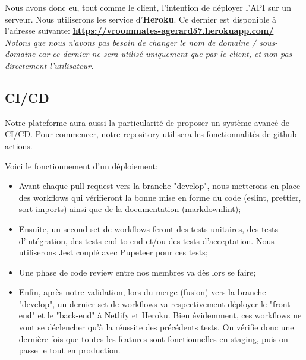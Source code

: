 Nous avons donc eu, tout comme le client, l'intention de déployer l'API sur un serveur. Nous utiliserons les service d'\textbf{Heroku}. Ce dernier est disponible à l'adresse suivante: \textbf{\href{https://vroommates-agerard57.herokuapp.com/}{https://vroommates-agerard57.herokuapp.com/}}\\

\textit{Notons que nous n'avons pas besoin de changer le nom de domaine / sous-domaine car ce dernier ne sera utilisé uniquement que par le client, et non pas directement l'utilisateur.}

\subsection{CI/CD}

Notre plateforme aura aussi la particularité de proposer un système avancé de CI/CD.
Pour commencer, notre repository utilisera les fonctionnalités de github actions. 

Voici le fonctionnement d'un déploiement:

\begin{itemize}
\item Avant chaque pull request vers la branche "develop", nous metterons en place des workflows qui vérifieront la bonne mise en forme du code (eslint, prettier, sort imports) ainsi que de la documentation (markdownlint);
\item Ensuite, un second set de workflows feront des tests unitaires, des tests d'intégration, des tests end-to-end et/ou des tests d'acceptation.
Nous utiliserons Jest couplé avec Pupeteer pour ces tests;
\item Une phase de code review entre nos membres va dès lors se faire;
\item Enfin, après notre validation, lors du merge (fusion) vers la branche "develop", un dernier set de workflows va respectivement déployer le "front-end" et le "back-end" à Netlify et Heroku. Bien évidemment, ces workflows ne vont se déclencher qu'à la réussite des précédents tests. On vérifie donc une dernière fois que toutes les features sont fonctionnelles en staging, puis on passe le tout en production. 
\end{itemize}

